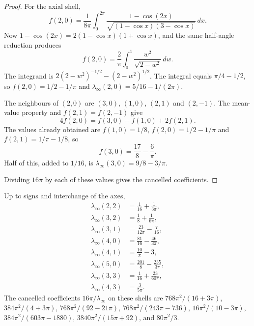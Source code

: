 \begin{proof}
For the axial shell,
\[
f(2,0)
=\frac{1}{8\pi}\int_0^{2\pi}
\frac{1-\cos(2x)}{\sqrt{(1-\cos x)(3-\cos x)}}\,dx.
\]
Now \(1-\cos(2x)=2(1-\cos x)(1+\cos x)\), and the same half-angle reduction
produces
\[
f(2,0)
=\frac{2}{\pi}\int_0^1\frac{w^2}{\sqrt{2-w^2}}\,dw.
\]
The integrand is \(2(2-w^2)^{-1/2}-(2-w^2)^{1/2}\).
The integral equals \(\pi/4-1/2\), so \(f(2,0)=1/2-1/\pi\) and
\(\lambda_\infty(2,0)=5/16-1/(2\pi)\).

The neighbours of \((2,0)\) are \((3,0)\), \((1,0)\), \((2,1)\) and
\((2,-1)\).
The mean-value property and \(f(2,1)=f(2,-1)\) give
\[
4f(2,0)=f(3,0)+f(1,0)+2f(2,1).
\]
The values already obtained are \(f(1,0)=1/8\), \(f(2,0)=1/2-1/\pi\) and
\(f(2,1)=1/\pi-1/8\), so
\[
f(3,0)=\frac{17}{8}-\frac{6}{\pi}.
\]
Half of this, added to \(1/16\), is \(\lambda_\infty(3,0)=9/8-3/\pi\).

Dividing \(16\pi\) by each of these values gives the cancelled
coefficients.
\end{proof}

\begin{proposition}
\label{prop:shells}
Up to signs and interchange of the axes,
\begin{align*}
\lambda_\infty(2,2)
&=\frac1{16}+\frac1{3\pi},\\
\lambda_\infty(3,2)
&=\frac18+\frac1{6\pi},\\
\lambda_\infty(3,1)
&=\frac{23}{12\pi}-\frac7{16},\\
\lambda_\infty(4,0)
&=\frac{81}{16}-\frac{46}{3\pi},\\
\lambda_\infty(4,1)
&=\frac{10}{\pi}-3,\\
\lambda_\infty(5,0)
&=\frac{201}{8}-\frac{235}{3\pi},\\
\lambda_\infty(3,3)
&=\frac1{16}+\frac{23}{60\pi},\\
\lambda_\infty(4,3)
&=\frac{3}{5\pi}.
\end{align*}
The cancelled coefficients \(16\pi/\lambda_\infty\) on these shells are
\(768\pi^2/(16+3\pi)\), \(384\pi^2/(4+3\pi)\),
\(768\pi^2/(92-21\pi)\), \(768\pi^2/(243\pi-736)\),
\(16\pi^2/(10-3\pi)\), \(384\pi^2/(603\pi-1880)\),
\(3840\pi^2/(15\pi+92)\), and \(80\pi^2/3\).
\end{proposition}

